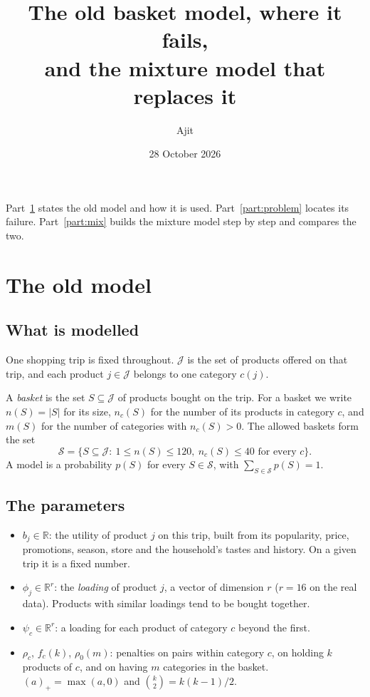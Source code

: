 \documentclass[11pt,a4paper]{article}
\title{The old basket model, where it fails,\\ and the mixture model that replaces it}
\author{Ajit}
\date{28 October 2026}
\newcommand{\R}{\mathbb R}
\newcommand{\pos}[1]{(#1)_+}
\begin{document}
\maketitle

\noindent Part~\ref{part:old} states the old model and how it is used. Part~\ref{part:problem} locates its
failure. Part~\ref{part:mix} builds the mixture model step by step and compares the two.

\section{The old model}\label{part:old}

\subsection{What is modelled}

One shopping trip is fixed throughout. $\mathcal J$ is the set of products offered on that trip, and each
product $j\in\mathcal J$ belongs to one category $c(j)$.

A \emph{basket} is the set $S\subseteq\mathcal J$ of products bought on the trip. For a basket we write
$n(S)=|S|$ for its size, $n_c(S)$ for the number of its products in category $c$, and $m(S)$ for the number
of categories with $n_c(S)>0$. The allowed baskets form the set
\[
\mathcal S=\{S\subseteq\mathcal J:\ 1\le n(S)\le 120,\ n_c(S)\le 40\text{ for every }c\}.
\]
A model is a probability $p(S)$ for every $S\in\mathcal S$, with $\sum_{S\in\mathcal S}p(S)=1$.

\subsection{The parameters}

\begin{itemize}
\item $b_j\in\R$: the utility of product $j$ on this trip, built from its popularity, price, promotions,
  season, store and the household's tastes and history. On a given trip it is a fixed number.
\item $\phi_j\in\R^r$: the \emph{loading} of product $j$, a vector of dimension $r$ ($r=16$ on the real data).
  Products with similar loadings tend to be bought together.
\item $\psi_c\in\R^r$: a loading for each product of category $c$ beyond the first.
\item $\rho_c$, $f_c(k)$, $\rho_0(m)$: penalties on pairs within category $c$, on holding $k$ products of $c$, and
  on having $m$ categories in the basket. $\pos{a}=\max(a,0)$ and $\binom{k}{2}=k(k-1)/2$.
\end{itemize}
\end{document}

